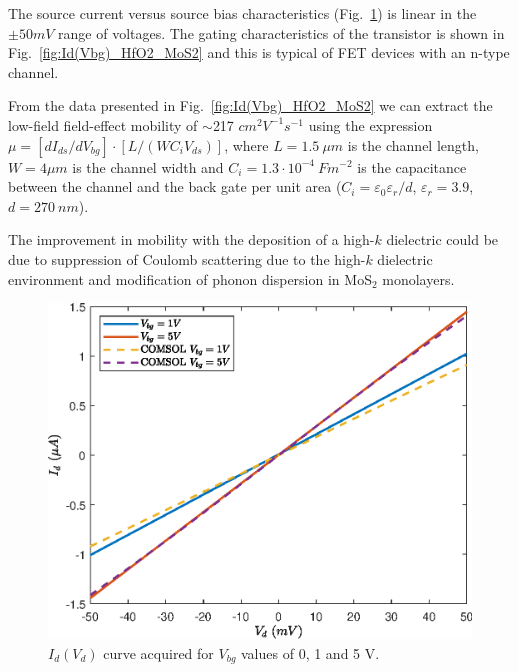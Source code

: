 \documentclass[12pt,a4paper,titlepage]{article}
\begin{document}
The source current versus source bias characteristics (Fig.~\ref{fig:Id(Vd)_HfO2_MoS2}) is linear in the $\pm 50 mV$ range of voltages. The gating characteristics of the transistor is shown in Fig.~\ref{fig:Id(Vbg)_HfO2_MoS2} and this is typical of FET devices with an n-type channel.

From the data presented in Fig.~\ref{fig:Id(Vbg)_HfO2_MoS2} we can extract the low-field field-effect mobility of $\sim$217 $cm^2 V^{-1} s^{-1}$ using the expression $\mu = [dI_{ds}/dV_{bg}]\cdot[L/(WC_iV_{ds})]$, where $L = 1.5~\mu m$ is the channel length, $W = 4 \mu m$ is the channel width and $C_i = 1.3 \cdot 10^{-4}~Fm^{-2}$ is the capacitance between the channel and the back gate per unit area ($C_i = \varepsilon_0 \varepsilon_r / d$, $\varepsilon_r = 3.9$, $d = 270~nm$).

The improvement in mobility with the deposition of a high-$k$ dielectric could be due to suppression of Coulomb scattering due to the high-$k$ dielectric environment and modification of phonon dispersion in MoS$_2$ monolayers.

\begin{figure}[H]
	\centering
	\includegraphics[width=.75\textwidth]{Grafici/Id(Vd)_HfO2_MoS2.eps} 
	\caption{$I_d(V_d)$ curve acquired for $V_{bg}$ values of 0, 1 and 5 V.}
	\label{fig:Id(Vd)_HfO2_MoS2}
\end{figure}
\end{document}
